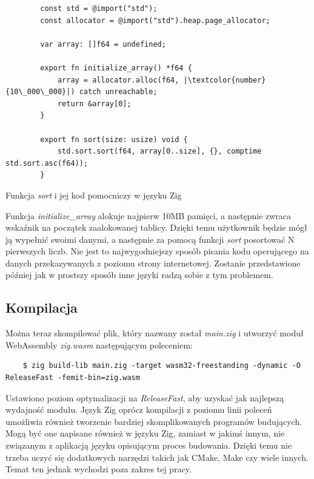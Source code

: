 \documentclass[language=polish,type=master]{aghmodern}
\begin{document}
\begin{listing}[H]
    \begin{verbatim}
        const std = @import("std");
        const allocator = @import("std").heap.page_allocator;

        var array: []f64 = undefined;

        export fn initialize_array() *f64 {
            array = allocator.alloc(f64, |\textcolor{number}{10\_000\_000}|) catch unreachable;
            return &array[0];
        }

        export fn sort(size: usize) void {
            std.sort.sort(f64, array[0..size], {}, comptime std.sort.asc(f64));
        }
    \end{verbatim}
    \caption{Funkcja \emph{sort} i jej kod pomocniczy w języku Zig}
\end{listing}

Funkcja \emph{initialize\_array} alokuje najpierw 10MB pamięci, a następnie zwraca wskaźnik na początek zaalokowanej tablicy.
Dzięki temu użytkownik będzie mógł ją wypełnić swoimi danymi, a następnie za pomocą funkcji \emph{sort} posortować N pierwszych liczb.
Nie jest to najwygodniejszy sposób pisania kodu operującego na danych przekazywanych z poziomu strony internetowej.
Zostanie przedstawione później jak w prostszy sposób inne języki radzą sobie z tym problemem.

\subsection{Kompilacja}
Można teraz skompilować plik, który nazwany został \emph{main.zig} i utworzyć moduł WebAssembly \emph{zig.wasm} następującym poleceniem:

\begin{verbatim}
    $ zig build-lib main.zig -target wasm32-freestanding -dynamic -O ReleaseFast -femit-bin=zig.wasm
\end{verbatim}

Ustawiono poziom optymalizacji na \emph{ReleaseFast}, aby uzyskać jak najlepszą wydajność modułu.
Język Zig oprócz kompilacji z poziomu linii poleceń umożliwia również tworzenie bardziej skomplikowanych programów budujących.
Mogą być one napisane również w języku Zig, zamiast w jakimś innym, nie związanym z aplikacją języku opisującym proces budowania.
Dzięki temu nie trzeba uczyć się dodatkowych narzędzi takich jak CMake, Make czy wiele innych.
Temat ten jednak wychodzi poza zakres tej pracy.
\end{document}
